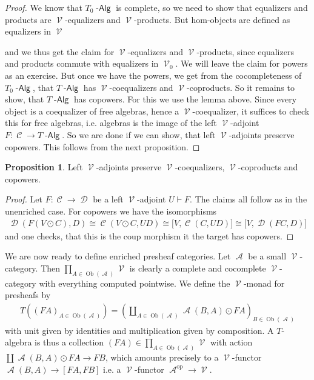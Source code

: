 \documentclass[a4paper,11pt,oneside,openany]{scrbook}
\DeclareMathOperator{\Alg}{-\mathsf{Alg}}
\newcommand{\from}{\colon}
\newcommand{\iso}{\cong}
\DeclareMathOperator{\op}{\text{op}}
\DeclareMathOperator{\V}{\mathcal{V}}
\DeclareMathOperator{\A}{\mathcal{A}}
\DeclareMathOperator{\C}{\mathcal{C}}
\DeclareMathOperator{\D}{\mathcal{D}}
\DeclareMathOperator{\Ob}{Ob}
\DeclareMathOperator{\copw}{\odot}
\theoremstyle{definition}
\theoremstyle{definition}
\newtheorem{prop}[thm]{Proposition}
\begin{document}
\begin{proof}
   We know that $T_{0}\Alg$ is complete, so we need to show that equalizers and products are $\V$-equalizers and $\V$-products. But hom-objects are 
   defined as equalizers in $\V$
      \begin{center}
      \end{center}
   and we thus get the claim for $\V$-equalizers and $\V$-products, since equalizers and products commute with equalizers in $\V_{0}$. We will leave the
   claim for powers as an exercise. But once we have the powers, we get from the cocompleteness of $T_{0}\Alg$, that $T\Alg$ has $\V$-coequalizers and
   $\V$-coproducts. So it remains to show, that $T\Alg$ has copowers. For this we use the lemma above. Since every object is a coequalizer of free 
   algebras, hence a $\V$-coequalizer, it suffices to check this for free algebras, i.e. algebras is the image of the left $\V$-adjoint 
   $F \from \C \to T\Alg$. So we are done if we can show, that left $\V$-adjoints preserve copowers. This follows from the next proposition. 
\end{proof}

\begin{prop}
   Left $\V$-adjoints preserve $\V$-coequalizers, $\V$-coproducts and copowers.
\end{prop}

\begin{proof}
   Let $F \from \C \to \D$ be a left $\V$-adjoint $U\vdash F$. The claims all follow as in the unenriched case. For copowers we have the isomorphisms
      \begin{align*}
         \D(F(V\copw C),D) \iso \C(V\copw C,UD) \iso \lbrack V,\C(C,UD) \rbrack \iso \lbrack V,\D(FC,D) \rbrack 
      \end{align*}
    and one checks, that this is the coup morphism it the target has copowers. 
\end{proof}

We are now ready to define enriched presheaf categories. Let $\A$ be a small $\V$-category. Then $\prod_{A \in \Ob(\A)}\V$ is clearly a complete and 
cocomplete $\V$-category with everything computed pointwise. We define the $\V$-monad for presheafs by 
   \begin{align*}
      T((FA)_{A \in \Ob(\A)}) = \left(\coprod_{A \in \Ob(\A)}\A(B,A)\copw FA\right)_{B \in \Ob(\A)}
   \end{align*} 
with unit given by identities and multiplication given by composition. A $T$-algebra is thus a collection $(FA) \in \prod_{A \in \Ob(\A)}\V$ with action 
$\coprod \A(B,A) \copw FA \to FB$, which amounts precisely to a $\V$-functor $\A(B,A) \to [FA,FB]$ i.e. a $\V$-functor $\A^{\op} \to \V$.
\end{document}

